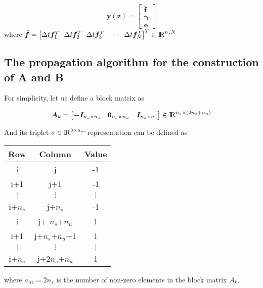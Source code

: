 \documentclass[12pt]{article}
\newcommand{\real}{\mbox{\rm I$\!$R}}
\begin{document}
\begin{equation}
\bm{y}(\bm{z})=\begin{bmatrix}
\bar{\bm{f}}\\
\bm{\gamma}\\
\bm{e}
\end{bmatrix} 
\end{equation}
%
where $\bar{\bm{f}} = \left[ \Delta t\bm{f}_{1}^T \ \ \Delta t\bm{f}_{2}^T \ \ \Delta t\bm{f}_{3}^T \ \ \cdots \ \ \Delta t\bm{f}_{N}^T \right]^T \in \real^{n_sN}$ 

\subsection{The propagation algorithm for the construction of A and B}

For simplicity, let us define a block matrix as

\begin{eqnarray}
\bm{A}_k= \begin{bmatrix}
\bm{-I}_{n_s \times n_s} &\bm{0}_{n_s \times n_u} &\bm{I}_{n_s \times n_s}\\
\end{bmatrix} \in \real^{n_s \times (2n_s + n_u)}
\end{eqnarray}

\noindent And its triplet $a \in \real^{3\times a_{nz}}$representation can be defined as

\begin{table}[h]
\begin{center}
\begin{tabular}{c|c|c}
Row    & Column        & Value \\ \hline
i      & j             & -1    \\
i+1    & j+1           & -1    \\
$\vdots$ & $\vdots$   &    $\vdots$     \\
i+$n_s$ & j+$n_s$        & -1    \\
i      & j+ $n_s$+$n_u$  & 1     \\
i+1    & j+$n_s$+$n_u$+1 & 1     \\
 $\vdots$ & $\vdots$     &    $\vdots$     \\
i+$n_s$ & j+$2n_s$+$n_u$  & 1    
\end{tabular}
\end{center}
\end{table}

where $a_{nz}=2n_s$ is the number of non-zero elements in the block matrix $A_k$.
\end{document}
